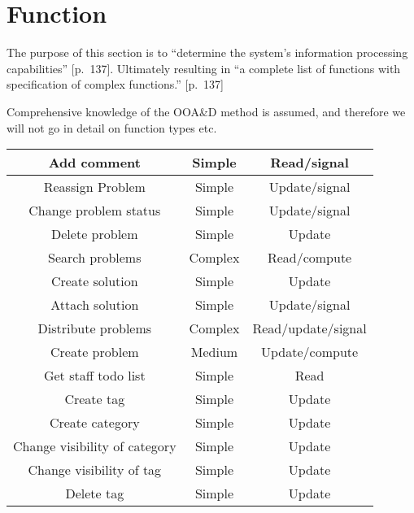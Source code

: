 \section{Function}
\label{sec:function}

The purpose of this section is to ``determine the system's information processing capabilities'' \cite{roedeaalborg}[p.~137]. Ultimately resulting in ``a complete list of functions with specification of complex functions.'' \cite{roedeaalborg}[p.~137]

Comprehensive knowledge of the OOA\&D method is assumed, and therefore we will not go in detail on function types etc. 

\begin{table}[h] %
\begin{center}
\begin{tabular}{|c|c|c|}
\hline
Add comment &   Simple & Read/signal   \\ \hline%
Reassign Problem & Simple   & Update/signal \\ \hline%
Change problem status &   Simple & Update/signal \\ \hline%
Delete problem & Simple &   Update \\   \hline%
Search problems & Complex &   Read/compute \\ \hline%
Create solution & Simple &   Update \\   \hline%
Attach solution & Simple &   Update/signal \\   \hline%
Distribute problems &   Complex & Read/update/signal \\   \hline%
Create problem & Medium & Update/compute \\   \hline%
Get staff todo list & Simple & Read \\   \hline%
Create tag & Simple &   Update \\ \hline%
Create category & Simple & Update \\ \hline%
Change visibility of category &   Simple &   Update \\   \hline%
Change visibility of tag &   Simple &  Update \\ \hline%
Delete tag & Simple &   Update \\ \hline%

\end{tabular}
\end{center}
\end{table}
